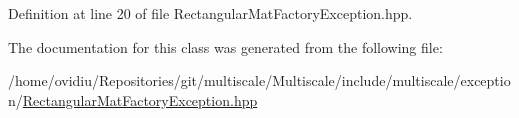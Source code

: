 Definition at line 20 of file Rectangular\-Mat\-Factory\-Exception.\-hpp.



The documentation for this class was generated from the following file\-:\begin{DoxyCompactItemize}
\item 
/home/ovidiu/\-Repositories/git/multiscale/\-Multiscale/include/multiscale/exception/\hyperlink{RectangularMatFactoryException_8hpp}{Rectangular\-Mat\-Factory\-Exception.\-hpp}\end{DoxyCompactItemize}
